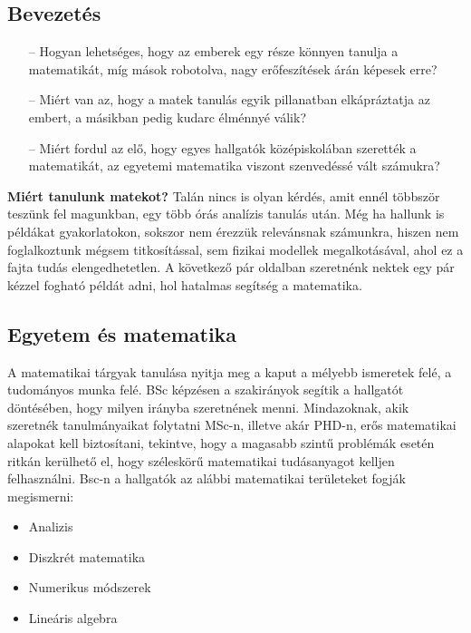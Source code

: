 \documentclass[../Main.tex]{subfiles}
\begin{document}
\subsection{Bevezetés}

\begin{itemize}
    \item[--] Hogyan lehetséges, hogy az emberek egy része könnyen tanulja a matematikát, míg
mások robotolva, nagy erőfeszítések árán képesek erre?
    \item[--] Miért van az, hogy a matek tanulás egyik pillanatban elkápráztatja az embert, a
másikban pedig kudarc élménnyé válik?
    \item[--] Miért fordul az elő, hogy egyes hallgatók középiskolában szerették a matematikát, az
egyetemi matematika viszont szenvedéssé vált számukra?
\end{itemize}

\begin{flushleft}

\textbf{Miért tanulunk matekot?} Talán nincs is olyan kérdés, amit ennél többször teszünk fel magunkban,
egy több órás analízis tanulás után. Még ha hallunk
is példákat gyakorlatokon, sokszor nem érezzük relevánsnak számunkra,
hiszen nem foglalkoztunk mégsem titkosítással, sem fizikai modellek megalkotásával,
ahol ez a fajta tudás elengedhetetlen. A következő pár oldalban szeretnénk nektek 
egy pár kézzel fogható példát adni, hol hatalmas segítség a matematika. 

\end{flushleft}

\subsection{Egyetem és matematika}

\begin{flushleft}
A matematikai tárgyak tanulása nyitja meg a kaput a mélyebb ismeretek felé, a tudományos munka felé.
BSc képzésen a szakirányok segítik a hallgatót döntésében, hogy milyen irányba szeretnének menni.
Mindazoknak, akik szeretnék tanulmányaikat folytatni MSc-n, illetve akár PHD-n,
erős matematikai alapokat kell biztosítani, tekintve, hogy a magasabb szintű problémák esetén ritkán kerülhető el,
hogy széleskörű matematikai tudásanyagot kelljen felhasználni. Bsc-n a hallgatók az alábbi 
matematikai területeket fogják megismerni:

\begin{itemize}
    \item Analizis
    \item Diszkrét matematika
    \item Numerikus módszerek
    \item Lineáris algebra
\end{itemize}

\end{flushleft}
\end{document}
